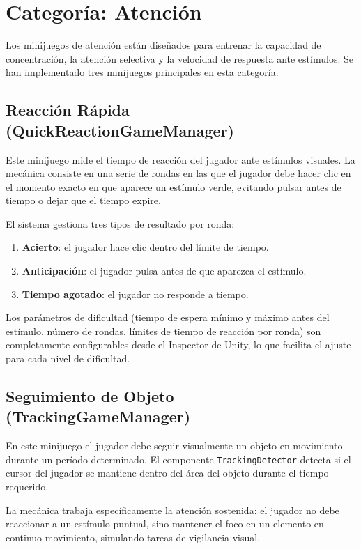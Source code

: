 \documentclass[12pt, a4paper]{report}
\begin{document}
\section{Categoría: Atención}

Los minijuegos de atención están diseñados para entrenar la capacidad de
concentración, la atención selectiva y la velocidad de respuesta ante
estímulos. Se han implementado tres minijuegos principales en esta categoría.

\subsection{Reacción Rápida (QuickReactionGameManager)}

Este minijuego mide el tiempo de reacción del jugador ante estímulos visuales.
La mecánica consiste en una serie de rondas en las que el jugador debe hacer
clic en el momento exacto en que aparece un estímulo verde, evitando pulsar
antes de tiempo o dejar que el tiempo expire.

El sistema gestiona tres tipos de resultado por ronda:
\begin{enumerate}
  \item \textbf{Acierto}: el jugador hace clic dentro del límite de tiempo.
  \item \textbf{Anticipación}: el jugador pulsa antes de que aparezca el
    estímulo.
  \item \textbf{Tiempo agotado}: el jugador no responde a tiempo.
\end{enumerate}

Los parámetros de dificultad (tiempo de espera mínimo y máximo antes del
estímulo, número de rondas, límites de tiempo de reacción por ronda) son
completamente configurables desde el Inspector de Unity, lo que facilita
el ajuste para cada nivel de dificultad.

\subsection{Seguimiento de Objeto (TrackingGameManager)}

En este minijuego el jugador debe seguir visualmente un objeto en movimiento
durante un período determinado. El componente \texttt{TrackingDetector}
detecta si el cursor del jugador se mantiene dentro del área del objeto
durante el tiempo requerido.

La mecánica trabaja específicamente la atención sostenida: el jugador no debe
reaccionar a un estímulo puntual, sino mantener el foco en un elemento en
continuo movimiento, simulando tareas de vigilancia visual.
\end{document}
